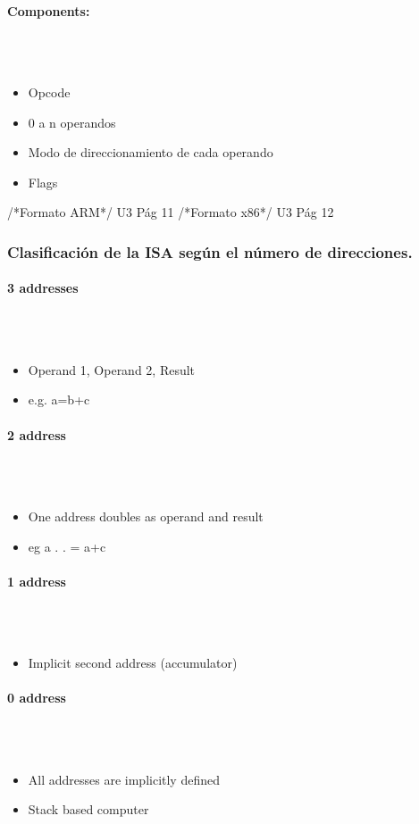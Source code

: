 \paragraph{Components:}\mbox{}\\\\%
\begin{itemize}
\item Opcode
\item 0 a n operandos
\item Modo de direccionamiento de cada operando
\item Flags
\end{itemize}

/*Formato ARM*/ U3 Pág 11
/*Formato x86*/ U3 Pág 12

\subsubsection{Clasificación de la ISA según el número de direcciones.}
\paragraph{3 addresses}\mbox{}\\\\%
\begin{itemize}
\item Operand 1, Operand 2, Result
\item e.g. a=b+c
\end{itemize}
\paragraph{2 address}\mbox{}\\\\%
\begin{itemize}
\item One address doubles as operand and result
\item eg a . . = a+c
\end{itemize}
\paragraph{1 address}\mbox{}\\\\%
\begin{itemize}
\item Implicit second address (accumulator)
\end{itemize}
\paragraph{0 address}\mbox{}\\\\%
\begin{itemize}
\item All addresses are implicitly defined
\item Stack based computer
\end{itemize}

